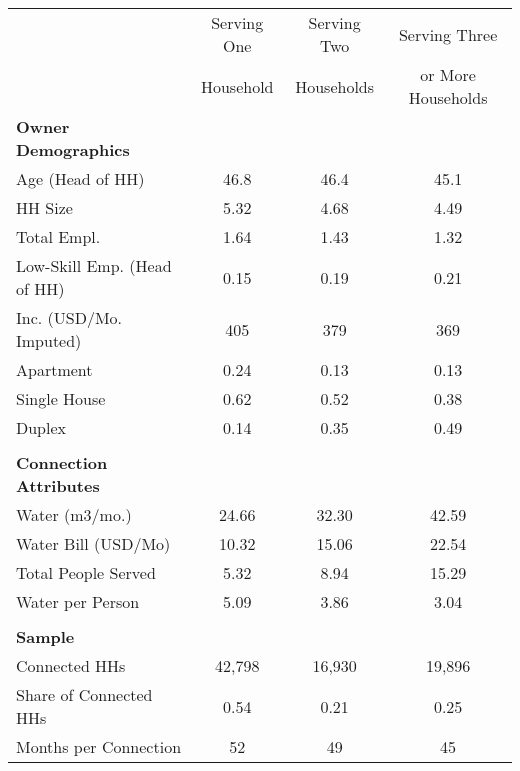 \begin{tabular}{l*{1}{ccc}}
 &Serving One &Serving Two &Serving Three  \\
 &Household &Households &or More Households  \\
\textbf{Owner Demographics} &\multicolumn{3}{c}{ }\\
Age (Head of HH) &       46.8  &       46.4  &       45.1   \\
HH Size &       5.32  &       4.68  &       4.49   \\
Total Empl. &       1.64  &       1.43  &       1.32   \\
Low-Skill Emp. (Head of HH) &         0.15 &          0.19 &         0.21  \\
Inc. (USD/Mo. Imputed) &        405  &        379  &        369   \\
Apartment &          0.24 &          0.13 &          0.13  \\
Single House &          0.62 &          0.52 &          0.38  \\
Duplex &          0.14  &          0.35 &          0.49  \\
 & &  & \\
\textbf{Connection Attributes} &\multicolumn{3}{c}{ }\\
Water (m3/mo.) &      24.66  &      32.30  &      42.59   \\
Water Bill (USD/Mo) &      10.32  &      15.06  &      22.54   \\
Total People Served &       5.32  &       8.94  &      15.29   \\
Water per Person &       5.09  &       3.86  &       3.04   \\
 & &  &  \\
\textbf{Sample} &\multicolumn{3}{c}{ }\\
Connected HHs &     42,798  &     16,930  &     19,896   \\
Share of Connected HHs &          0.54 &          0.21 &          0.25  \\
Months per Connection &         52  &         49  &         45   \\
\end{tabular}